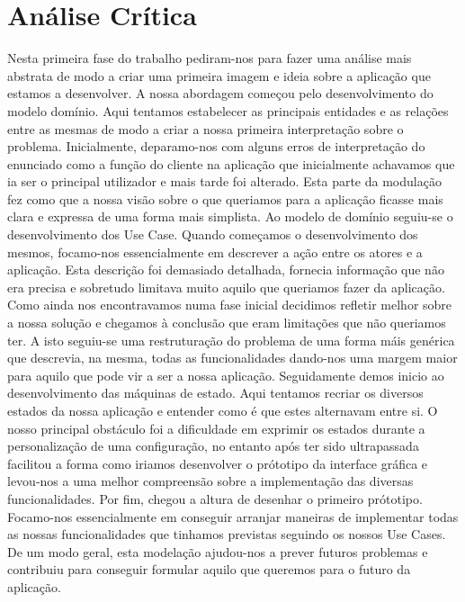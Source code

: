 \documentclass[11pt]{article} %
\begin{document}
\section{Análise Crítica}
Nesta primeira fase do trabalho pediram-nos para fazer uma análise mais abstrata de modo a criar uma primeira imagem e ideia sobre a aplicação que estamos a desenvolver. A nossa abordagem começou pelo desenvolvimento do modelo domínio. Aqui tentamos estabelecer as principais entidades e as relações entre as mesmas de modo a criar a nossa primeira interpretação sobre o problema. Inicialmente, deparamo-nos com alguns erros de interpretação do enunciado como a função do cliente na aplicação que inicialmente achavamos que ia ser o principal utilizador e mais tarde foi alterado. Esta parte da modulação fez como que a nossa visão sobre o que queriamos para a aplicação ficasse mais clara e expressa de uma forma mais simplista. Ao modelo de domínio seguiu-se o desenvolvimento dos Use Case. Quando começamos o desenvolvimento dos mesmos, focamo-nos essencialmente em descrever a ação entre os atores e a aplicação. Esta descrição foi demasiado detalhada, fornecia informação que não era precisa e sobretudo limitava muito aquilo que queriamos fazer da aplicação. Como ainda nos encontravamos numa fase inicial decidimos refletir melhor sobre a nossa solução e chegamos à conclusão que eram limitações que não queriamos ter. A isto seguiu-se uma restruturação do problema de uma forma máis genérica que descrevia, na mesma, todas as funcionalidades dando-nos uma margem maior para aquilo que pode vir a ser a nossa aplicação.
Seguidamente demos inicio ao desenvolvimento das máquinas de estado. Aqui tentamos recriar os diversos estados da nossa aplicação e entender como é que estes alternavam entre si. O nosso principal obstáculo foi a dificuldade em exprimir os estados durante a personalização de uma configuração, no entanto após ter sido ultrapassada facilitou a forma como iriamos desenvolver o prótotipo da interface gráfica e levou-nos a uma melhor compreensão sobre a implementação das diversas funcionalidades. Por fim, chegou a altura de desenhar o primeiro prótotipo. Focamo-nos essencialmente em conseguir arranjar maneiras de implementar todas as nossas funcionalidades que tinhamos previstas seguindo os nossos Use Cases. De um modo geral, esta modelação ajudou-nos a prever futuros problemas e contribuiu para conseguir formular aquilo que queremos para o futuro da aplicação.
\end{document}

